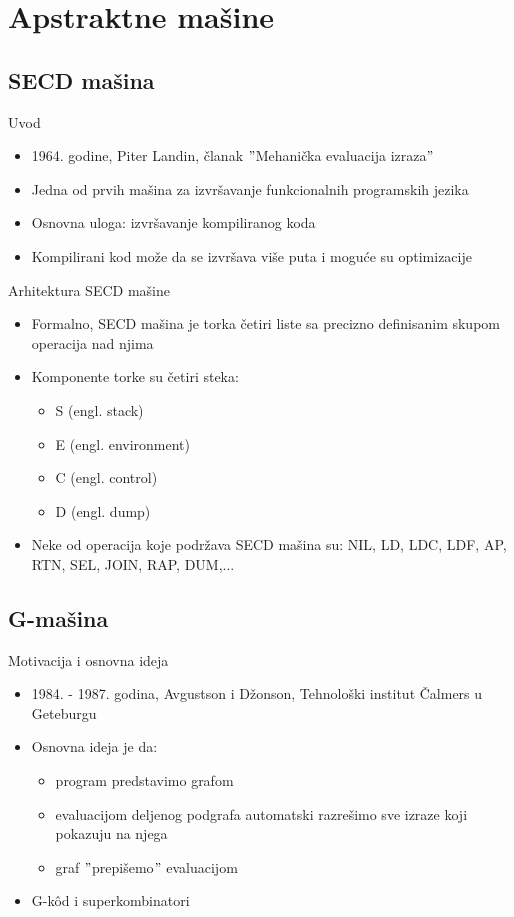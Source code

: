 \documentclass[xcolor={dvipsnames}, 11pt]{beamer}
\begin{document}
\section{Apstraktne mašine}

\subsection{SECD mašina}
\begin{frame}{Uvod}
	\begin{itemize}
	\item 1964. godine, Piter Landin, članak $"$Mehanička evaluacija izraza$"$
	\item Jedna od prvih mašina za izvršavanje funkcionalnih programskih jezika
	\item Osnovna uloga: izvršavanje kompiliranog koda
	\item Kompilirani kod može da se izvršava više puta i moguće su optimizacije
	\end{itemize}
\end{frame}

\begin{frame}{Arhitektura SECD mašine}
	\begin{itemize}
	\item Formalno, SECD mašina je torka četiri liste sa precizno definisanim skupom operacija nad njima
	\item Komponente torke su četiri steka: 
		\begin{itemize}
		\item S (engl. stack)
		\item E (engl. environment)
		\item C (engl. control)
		\item D	(engl. dump)
		\end{itemize}
	\item Neke od operacija koje podržava SECD mašina su: NIL, LD, LDC, LDF, AP, RTN, SEL, JOIN, RAP, DUM,...
	\end{itemize}
	
\end{frame}

\subsection{G-mašina}
\begin{frame}{Motivacija i osnovna ideja}
	\begin{itemize}
		\item 1984. - 1987. godina, Avgustson i Džonson, Tehnološki institut Čalmers u Geteburgu
		\item Osnovna ideja je da: 
			\begin{itemize}
			\item program predstavimo grafom
			\item evaluacijom deljenog podgrafa automatski razrešimo sve izraze koji pokazuju na njega
			\item graf $"$prepišemo$"$ evaluacijom
			\end{itemize}
		\item G-k\^od i superkombinatori	
	\end{itemize}
\end{frame}
\end{document}
